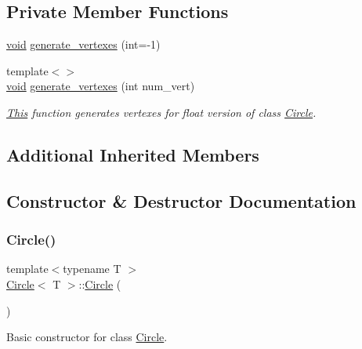 \subsection*{Private Member Functions}
\begin{DoxyCompactItemize}
\item 
\mbox{\hyperlink{glad_8h_a950fc91edb4504f62f1c577bf4727c29}{void}} \mbox{\hyperlink{classCircle_a07ce44d6b3a70ee7cbcf19e02e50c361}{generate\+\_\+vertexes}} (int=-\/1)
\item 
{\footnotesize template$<$$>$ }\\\mbox{\hyperlink{glad_8h_a950fc91edb4504f62f1c577bf4727c29}{void}} \mbox{\hyperlink{classCircle_a5c5d9e9bf7ddada0681ad6977e4469f6}{generate\+\_\+vertexes}} (int num\+\_\+vert)
\begin{DoxyCompactList}\small\item\em \mbox{\hyperlink{classThis}{This}} function generates vertexes for float version of class \mbox{\hyperlink{classCircle}{Circle}}. \end{DoxyCompactList}\end{DoxyCompactItemize}
\subsection*{Additional Inherited Members}


\subsection{Constructor \& Destructor Documentation}
\mbox{\label{classCircle_a0a298ea0e982a94a60091aeb2767f6e4}} 
\subsubsection{\texorpdfstring{Circle()}{Circle()}\hspace{0.1cm}{\footnotesize\ttfamily [1/3]}}
{\footnotesize\ttfamily template$<$typename T $>$ \\
\mbox{\hyperlink{classCircle}{Circle}}$<$ T $>$\+::\mbox{\hyperlink{classCircle}{Circle}} (\begin{DoxyParamCaption}{ }\end{DoxyParamCaption})}



Basic constructor for class \mbox{\hyperlink{classCircle}{Circle}}. 


